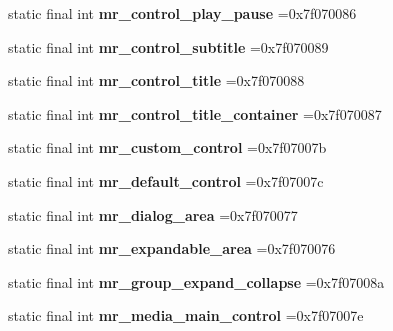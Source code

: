 \begin{DoxyCompactItemize}
static final int {\bfseries mr\+\_\+control\+\_\+play\+\_\+pause} =0x7f070086
\item 
\mbox{\label{classproject4_1_1xaria_1_1R_1_1id_acee9e4ede9ab40b6ad78e2a4541c6c83}} 
static final int {\bfseries mr\+\_\+control\+\_\+subtitle} =0x7f070089
\item 
\mbox{\label{classproject4_1_1xaria_1_1R_1_1id_a10302d80f770b9d48c58a6c205206ce9}} 
static final int {\bfseries mr\+\_\+control\+\_\+title} =0x7f070088
\item 
\mbox{\label{classproject4_1_1xaria_1_1R_1_1id_a2759cb8c936969200198526b702ea95e}} 
static final int {\bfseries mr\+\_\+control\+\_\+title\+\_\+container} =0x7f070087
\item 
\mbox{\label{classproject4_1_1xaria_1_1R_1_1id_af8c7cf93ea1a54e8448aa6086194b43e}} 
static final int {\bfseries mr\+\_\+custom\+\_\+control} =0x7f07007b
\item 
\mbox{\label{classproject4_1_1xaria_1_1R_1_1id_a6f86010161da54ad4abf2e3aa8bc5044}} 
static final int {\bfseries mr\+\_\+default\+\_\+control} =0x7f07007c
\item 
\mbox{\label{classproject4_1_1xaria_1_1R_1_1id_a28170598d0367e2b007f70442c3ceded}} 
static final int {\bfseries mr\+\_\+dialog\+\_\+area} =0x7f070077
\item 
\mbox{\label{classproject4_1_1xaria_1_1R_1_1id_a3836cca42f0f307a47ce75f46dd4711f}} 
static final int {\bfseries mr\+\_\+expandable\+\_\+area} =0x7f070076
\item 
\mbox{\label{classproject4_1_1xaria_1_1R_1_1id_a1a9013f224896a58ab7916cc83e2e14f}} 
static final int {\bfseries mr\+\_\+group\+\_\+expand\+\_\+collapse} =0x7f07008a
\item 
\mbox{\label{classproject4_1_1xaria_1_1R_1_1id_af456945b58fdc528c9cb05346f945441}} 
static final int {\bfseries mr\+\_\+media\+\_\+main\+\_\+control} =0x7f07007e

\end{DoxyCompactItemize}
